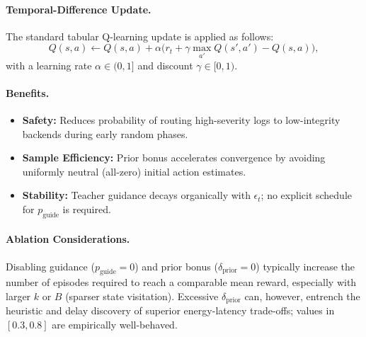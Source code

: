\paragraph{Temporal-Difference Update.}
The standard tabular Q-learning update is applied as follows:
\[
Q(s,a) \leftarrow Q(s,a) + \alpha \Big( r_t + \gamma \max_{a'} Q(s',a') - Q(s,a) \Big),
\]
with a learning rate $\alpha \in (0,1]$ and discount $\gamma \in [0,1)$.

\paragraph{Benefits.}
\begin{itemize}
  \item \textbf{Safety:} Reduces probability of routing high-severity logs to low-integrity backends during early random phases.
  \item \textbf{Sample Efficiency:} Prior bonus accelerates convergence by avoiding uniformly neutral (all-zero) initial action estimates.
  \item \textbf{Stability:} Teacher guidance decays organically with $\epsilon_t$; no explicit schedule for $p_{\text{guide}}$ is required.
\end{itemize}

\paragraph{Ablation Considerations.}
Disabling guidance ($p_{\text{guide}}=0$) and prior bonus ($\delta_{\text{prior}}=0$) typically increase the number of episodes required to reach a comparable mean reward, especially with larger $k$ or $B$ (sparser state visitation). Excessive $\delta_{\text{prior}}$ can, however, entrench the heuristic and delay discovery of superior energy-latency trade-offs; values in $[0.3,0.8]$ are empirically well-behaved.

